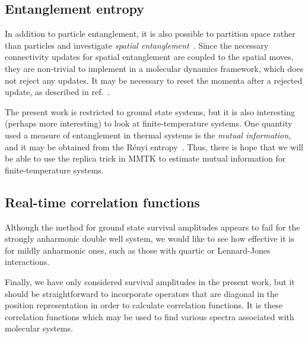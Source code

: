 \subsection{Entanglement entropy}

In addition to particle entanglement, it is also possible to partition space rather than particles and investigate \emph{spatial entanglement}~\cite{herdman2014path}.
Since the necessary connectivity updates for spatial entanglement are coupled to the spatial moves, they are non-trivial to implement in a molecular dynamics framework, which does not reject any updates.
It may be necessary to reset the momenta after a rejected update, as described in ref.~\cite[296]{tuckerman2010statistical}.

The present work is restricted to ground state systems, but it is also interesting (perhaps more interesting) to look at finite-temperature systems.
One quantity used a measure of entanglement in thermal systems is the \emph{mutual information}, and it may be obtained from the Rényi entropy~\cite{singh2011finite}.
Thus, there is hope that we will be able to use the replica trick in MMTK to estimate mutual information for finite-temperature systems.


\subsection{Real-time correlation functions}

Although the method for ground state survival amplitudes appears to fail for the strongly anharmonic double well system, we would like to see how effective it is for mildly anharmonic ones, such as those with quartic or Lennard-Jones interactions.

Finally, we have only considered survival amplitudes in the present work, but it should be straightforward to incorporate operators that are diagonal in the position representation in order to calculate correlation functions.
It is these correlation functions which may be used to find various spectra associated with molecular systems.
